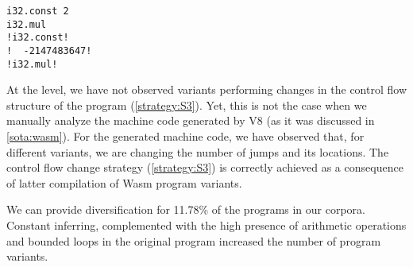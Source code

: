 {\begin{code}
\begin{minipage}[b]{0.32\linewidth}
\begin{minipage}[t]{0.46\linewidth}
            \begin{lstlisting}
i32.const 2
i32.mul
!i32.const!
!  -2147483647!
!i32.mul!
            \end{lstlisting}
        \end{minipage}
    \end{minipage}
    \end{code}
}

At the \wasm level, we have not observed variants performing changes in the control flow structure of the program (\autoref{strategy:S3}). 
Yet, this is not the case when we manually analyze the machine code generated by V8 (as it was discussed in \autoref{sota:wasm}).
For the generated machine code, we have observed that, for different variants, we are changing the number of jumps and its locations.
The control flow change strategy (\autoref{strategy:S3}) is correctly achieved as a consequence of latter compilation of Wasm program variants.

\begin{tcolorbox}[title=Answer to RQ1.,boxrule=2pt,arc=.3em,boxsep=1.5mm]
    We can provide diversification for 11.78\% of the programs in our corpora. Constant inferring, complemented with the high presence of arithmetic operations and bounded loops in the original program increased the number of program variants. 
\end{tcolorbox}



